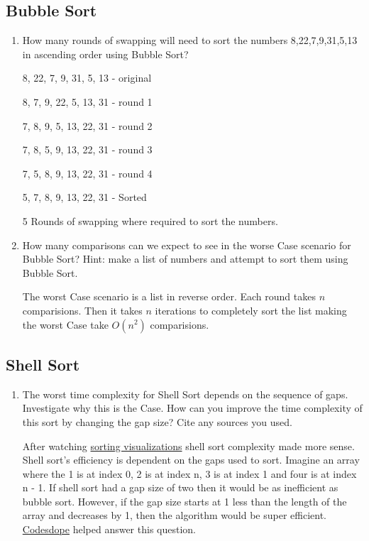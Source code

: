 \documentclass[12pt]{article}
\newenvironment{QandA}{\begin{enumerate}[label=\bfseries\alph*.]\bfseries}
{\end{enumerate}}
\newenvironment{answered}{\par\normalfont}{}
\begin{document}
    \subsection{Bubble Sort}
    \begin{QandA}

    \item How many rounds of swapping will need to sort the numbers 8,22,7,9,31,5,13 in ascending order using Bubble Sort?
        \begin{answered}
			\vskip 0.2in
			\centerline{8, 22, 7, 9, 31, 5, 13 - original}

			\centerline{8, 7, 9, 22, 5, 13, 31 - round 1}

			\centerline{7, 8, 9, 5, 13, 22, 31 - round 2}

			\centerline{7, 8, 5, 9, 13, 22, 31 - round 3}

			\centerline{7, 5, 8, 9, 13, 22, 31 - round 4}

			\centerline{5, 7, 8, 9, 13, 22, 31 - Sorted}

            5 Rounds of swapping where required to sort the numbers.
        \end{answered}

    \item How many comparisons can we expect to see in the worse Case scenario for Bubble Sort? Hint: make a list of numbers and attempt to sort them using Bubble Sort.

        \begin{answered}
			The worst Case scenario is a list in reverse order. Each round takes $n$ comparisions. Then it takes $n$ iterations to completely sort the list making the worst Case take $O(n^2)$ comparisions.
        \end{answered}
    \end{QandA}

    \subsection{Shell Sort}
    \begin{QandA}

    \item The worst time complexity for Shell Sort depends on the sequence of gaps. Investigate why this is the Case. How can you improve the time complexity of this sort by changing the gap size? Cite any sources you used.
        \begin{answered}
            After watching \href{https://www.youtube.com/watch?v=NYWEM7H3iYc\&t=269s}{sorting visualizations} shell sort complexity made more sense.
			Shell sort's efficiency is dependent on the gaps used to sort.
			Imagine an array where the 1 is at index 0, 2 is at index n, 3 is at index 1 and four is at index n - 1. If shell sort had a gap size of two then it would be as inefficient as bubble sort.
			However, if the gap size starts at 1 less than the length of the array and decreases by 1, then the algorithm would be super efficient.
			\href{https://www.codesdope.com/blog/article/shell-sort/}{Codesdope} helped answer this question.
        \end{answered}

    \end{QandA}
\end{document}
